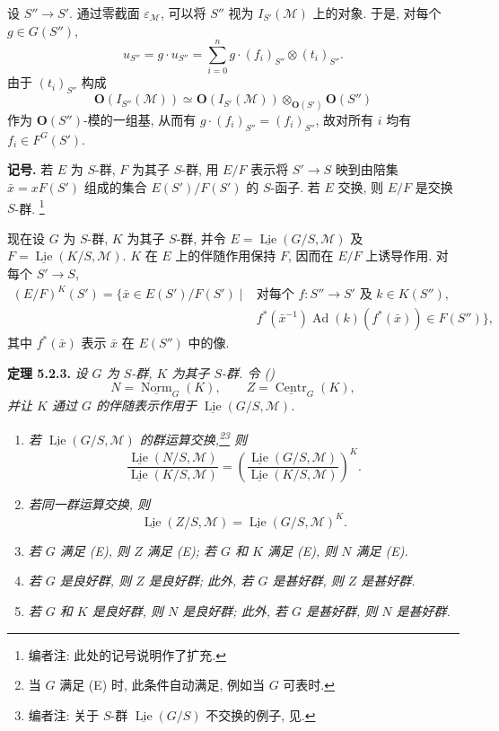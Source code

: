 设 \(S''\to S'\). 通过零截面 \(\varepsilon_{\mathscr M}\),
可以将 \(S''\) 视为 \(I_{S'}(\mathscr M)\) 上的对象. 于是, 对每个
\(g\in G(S'')\),
\[
 u_{S''}=g\cdot u_{S''}
   =\sum_{i=0}^{n}g\cdot(f_i)_{S''}\otimes(t_i)_{S''}.
\]
由于 \((t_i)_{S''}\) 构成
\[
 \mathbf O(I_{S''}(\mathscr M))
 \simeq \mathbf O(I_{S'}(\mathscr M))
        \otimes_{\mathbf O(S')}\mathbf O(S'')
\]
作为 \(\mathbf O(S'')\)-模的一组基, 从而有
\(g\cdot(f_i)_{S''}=(f_i)_{S''}\), 故对所有 \(i\) 均有
\(f_i\in F^G(S')\).

\medskip
\noindent\textbf{记号.}
若 \(E\) 为 \(S\)-群, \(F\) 为其子 \(S\)-群, 用 \(E/F\)
表示将 \(S'\to S\) 映到由陪集 \(\bar x=xF(S')\) 组成的集合
\(E(S')/F(S')\) 的 \(S\)-函子. 若 \(E\) 交换,
则 \(E/F\) 是交换 \(S\)-群.
\footnote{编者注: 此处的记号说明作了扩充.}

现在设 \(G\) 为 \(S\)-群, \(K\) 为其子 \(S\)-群, 并令
\(E=\underline{\operatorname{Lie}}(G/S,\mathscr M)\) 及
\(F=\underline{\operatorname{Lie}}(K/S,\mathscr M)\).
\(K\) 在 \(E\) 上的伴随作用保持 \(F\), 因而在 \(E/F\) 上诱导作用.
对每个 \(S'\to S\),
\[
\begin{split}
 (E/F)^K(S')=\{\bar x\in E(S')/F(S')\mid{}&
  \text{对每个 }f:S''\to S'\text{ 及 }k\in K(S''),\\[-2pt]
 &f^*(\bar x^{-1})\operatorname{Ad}(k)(f^*(\bar x))\in F(S'')\},
\end{split}
\]
其中 \(f^*(\bar x)\) 表示 \(\bar x\) 在 \(E(S'')\) 中的像.

\medskip
\noindent{}\textbf{定理 5.2.3.}
\textit{设 \(G\) 为 \(S\)-群, \(K\) 为其子 \(S\)-群. 令
()}
\[
 N=\underline{\operatorname{Norm}}_G(K),
 \qquad
 Z=\underline{\operatorname{Centr}}_G(K),
\]
\textit{并让 \(K\) 通过 \(G\) 的伴随表示作用于
\(\underline{\operatorname{Lie}}(G/S,\mathscr M)\).}
\begin{enumerate}
\renewcommand{\labelenumi}{(\roman{enumi})}
\item{} \textit{若 \(\underline{\operatorname{Lie}}(G/S,\mathscr M)\)
的群运算交换,\footnote{当 \(G\) 满足 (E) 时, 此条件自动满足, 例如当 \(G\) 可表时.}\footnote{编者注: 关于 \(S\)-群
\(\underline{\operatorname{Lie}}(G/S)\) 不交换的例子, 见.}
则}
\[
 \frac{\underline{\operatorname{Lie}}(N/S,\mathscr M)}
      {\underline{\operatorname{Lie}}(K/S,\mathscr M)}
 =
 \left(
 \frac{\underline{\operatorname{Lie}}(G/S,\mathscr M)}
      {\underline{\operatorname{Lie}}(K/S,\mathscr M)}
 \right)^K .
\]
\item{} \textit{若同一群运算交换, 则}
\[
 \underline{\operatorname{Lie}}(Z/S,\mathscr M)
   =\underline{\operatorname{Lie}}(G/S,\mathscr M)^K .
\]
\item \textit{若 \(G\) 满足 (E), 则 \(Z\) 满足 (E);
若 \(G\) 和 \(K\) 满足 (E), 则 \(N\) 满足 (E).}
\item \textit{若 \(G\) 是良好群, 则 \(Z\) 是良好群;
此外, 若 \(G\) 是甚好群, 则 \(Z\) 是甚好群.}
\item \textit{若 \(G\) 和 \(K\) 是良好群, 则 \(N\) 是良好群;
此外, 若 \(G\) 是甚好群, 则 \(N\) 是甚好群.}
\end{enumerate}

